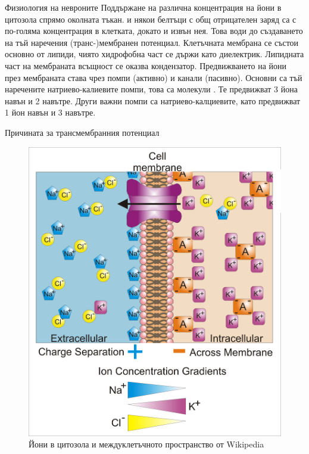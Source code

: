 \begin{frame}[t]{Физиология на невроните}
  Поддържане на различна концентрация на йони в цитозола спрямо околната тъкан.
   и някои белтъци с общ отрицателен заряд са с по-голяма концентрация в клетката,
  докато  и  извън нея. Това води до създаването на тъй наречения (транс-)мембранен потенциал.
  Клетъчната мембрана се състои основно от липиди, чиято хидрофобна част се държи като диелектрик.
  Липидната част на мембраната всъщност се оказва кондензатор. 
  Предвижването на йони през мембраната става чрез помпи (активно) и канали (пасивно). 
  Основни са тъй наречените натриево-калиевите помпи, това са молекули . Те предвижват 3  йона навън и 2  навътре. 
  Други важни помпи са натриево-калциевите, като предвижват 1  йон навън и 3  навътре.
\end{frame}

\begin{frame}[t]{Причината за трансмембранния потенциал}
  \begin{figure}[htbp!]
    \centering
    \includegraphics[width=\textwidth,height=0.7\textheight,keepaspectratio]{membrane-potential.png}
    \caption{Йони в цитозола и междуклетъчното пространство от Wikipedia}
  \end{figure}
\end{frame}

